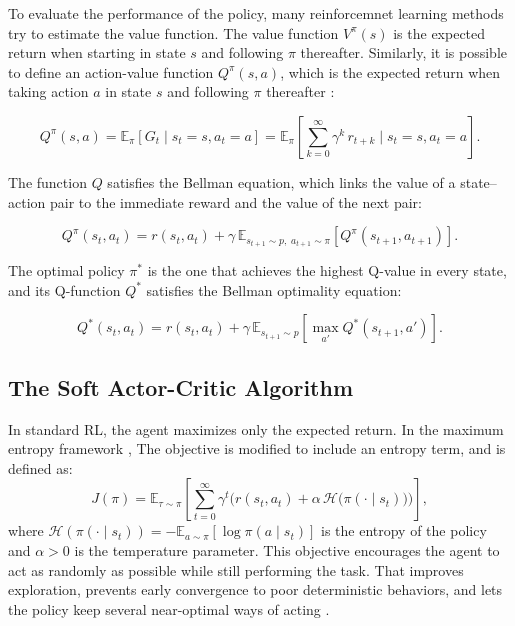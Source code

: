 \documentclass[preprint,10pt]{elsarticle}
\begin{document}
To evaluate the performance of the policy, many reinforcemnet learning methods try to estimate the value function. The value function $V^\pi(s)$ is the expected return when starting in state $s$ and following $\pi$ thereafter. Similarly, it is possible to define an action-value function $Q^\pi(s, a)$, which is the expected return when taking action $a$ in state $s$ and following $\pi$ thereafter \citep{Sutton2018Reinforcement}:

\begin{equation} 
  Q^\pi(s, a) = \mathbb{E}_{\pi}\left[G_t \mid s_t = s, a_t = a\right] = \mathbb{E}_{\pi}\left[\sum_{k=0}^{\infty} \gamma^k \, r_{t+k} \mid s_t = s, a_t = a\right]. 
\end{equation}

The function $Q$ satisfies the Bellman equation, which links the value of a state–action pair to the immediate reward and the value of the next pair:

\begin{equation}
  Q^\pi(s_t, a_t) = r(s_t, a_t) + \gamma \, \mathbb{E}_{s_{t+1} \sim p,\; a_{t+1} \sim \pi}\left[Q^\pi(s_{t+1}, a_{t+1})\right].
\end{equation}

The optimal policy $\pi^*$ is the one that achieves the highest Q-value in every state, and its Q-function $Q^*$ satisfies the Bellman optimality equation:

\begin{equation}
  Q^*(s_t, a_t) = r(s_t, a_t) + \gamma \, \mathbb{E}_{s_{t+1} \sim p}\left[\max_{a'} Q^*(s_{t+1}, a')\right].
\end{equation}

\subsection{The Soft Actor-Critic Algorithm}
\label{sec:sac}

In standard RL, the agent maximizes only the expected return. In the maximum entropy framework \citep{ziebart2008maximum,ziebart2010modeling,haarnoja2017reinforcement}, The objective is modified to include an entropy term, and is defined as:
\begin{equation}
    J(\pi) = \mathbb{E}_{\tau \sim \pi}\left[\sum_{t=0}^{\infty} \gamma^t \Big( r(s_t, a_t) + \alpha \, \mathcal{H}\big(\pi(\cdot \mid s_t)\big) \Big)\right],
    \label{eq:maxent_objective}
\end{equation}
where $\mathcal{H}(\pi(\cdot \mid s_t)) = -\mathbb{E}_{a \sim \pi}\left[\log \pi(a \mid s_t)\right]$ is the entropy of the policy and $\alpha > 0$ is the temperature parameter. This objective encourages the agent to act as randomly as possible while still performing the task. That improves exploration, prevents early convergence to poor deterministic behaviors, and lets the policy keep several near-optimal ways of acting \citep{haarnoja2017reinforcement,haarnoja2018soft}.
\end{document}
